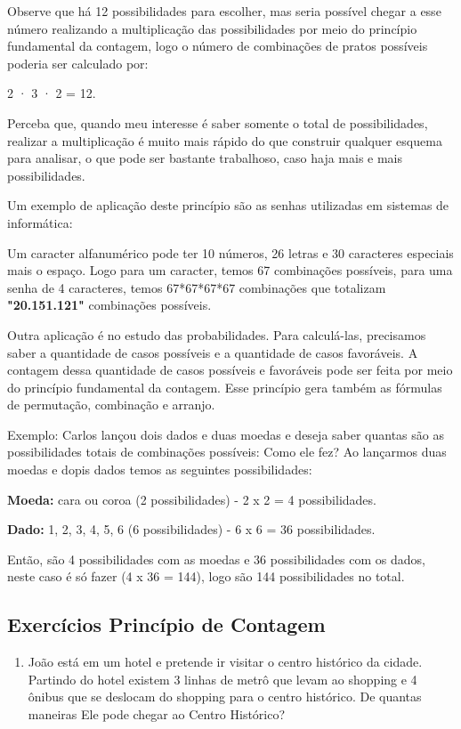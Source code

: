 \begin{multicols*}{2}
    Observe que há 12 possibilidades para escolher, mas seria possível chegar a esse número realizando a multiplicação das possibilidades por meio do princípio fundamental da contagem, logo o número de combinações de pratos possíveis poderia ser calculado por:

    2 · 3 · 2 = 12.

    Perceba que, quando meu interesse é saber somente o total de possibilidades, realizar a multiplicação é muito mais rápido do que construir qualquer esquema para analisar, o que pode ser bastante trabalhoso, caso haja mais e mais possibilidades.

    Um exemplo de aplicação deste princípio são as senhas utilizadas em sistemas de informática:

    Um caracter alfanumérico pode ter 10 números, 26 letras e 30 caracteres especiais mais o espaço. Logo para um caracter, temos 67 combinações possíveis, para uma senha de 4 caracteres, temos 67*67*67*67 combinações que totalizam \textbf{"20.151.121"} combinações possíveis.

    Outra aplicação é no estudo das probabilidades. Para calculá-las, precisamos saber a quantidade de casos possíveis e a quantidade de casos favoráveis. A contagem dessa quantidade de casos possíveis e favoráveis pode ser feita por meio do princípio fundamental da contagem. Esse princípio gera também as fórmulas de permutação, combinação e arranjo.

    Exemplo: Carlos lançou dois dados e duas moedas e deseja saber quantas são as possibilidades totais de combinações possíveis: Como ele fez?
    Ao lançarmos duas moedas e dopis dados temos as seguintes possibilidades:

    \textbf{Moeda:} cara ou coroa (2 possibilidades) - 2 x 2 = 4 possibilidades.

    \textbf{Dado:} 1, 2, 3, 4, 5, 6 (6 possibilidades) - 6 x 6 = 36 possibilidades.

    Então, são 4 possibilidades com as moedas e 36 possibilidades com os dados, neste caso é só fazer (4 x 36 = 144), logo são 144 possibilidades no total.

    \subsection{Exercícios Princípio de Contagem}

    \begin{enumerate}

        \item João está em um hotel e pretende ir visitar o centro histórico da cidade. Partindo do hotel existem 3 linhas de metrô que levam ao shopping e 4 ônibus que se deslocam do shopping para o centro histórico. De quantas maneiras Ele pode chegar ao Centro Histórico?


\end{enumerate}
\end{multicols*}

